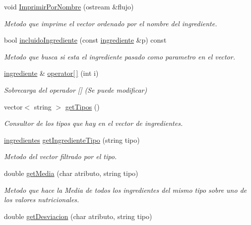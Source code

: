\begin{DoxyCompactItemize}
void \hyperlink{classingredientes_adefafd151edf8a8997bca2dc22057ece}{Imprimir\+Por\+Nombre} (ostream \&flujo)
\begin{DoxyCompactList}\small\item\em Metodo que imprime el vector ordenado por el nombre del ingrediente. \end{DoxyCompactList}\item 
bool \hyperlink{classingredientes_a6d3f30e2e79299a970c705f61a8ee4d7}{incluido\+Ingrediente} (const \hyperlink{classingrediente}{ingrediente} \&p) const
\begin{DoxyCompactList}\small\item\em Metodo que busca si esta el ingrediente pasado como parametro en el vector. \end{DoxyCompactList}\item 
\hyperlink{classingrediente}{ingrediente} \& \hyperlink{classingredientes_a9e099786f83d0ac3cf38317b194691db}{operator\mbox{[}$\,$\mbox{]}} (int i)
\begin{DoxyCompactList}\small\item\em Sobrecarga del operador \mbox{[}\mbox{]} (Se puede modificar) \end{DoxyCompactList}\item 
vector$<$ string $>$ \hyperlink{classingredientes_a57594cb6c675d23f7894fe6388c95a7f}{get\+Tipos} ()
\begin{DoxyCompactList}\small\item\em Consultor de los tipos que hay en el vector de ingredientes. \end{DoxyCompactList}\item 
\hyperlink{classingredientes}{ingredientes} \hyperlink{classingredientes_a160ecb07facb16cbe7369ea797c67549}{get\+Ingrediente\+Tipo} (string tipo)
\begin{DoxyCompactList}\small\item\em Metodo del vector filtrado por el tipo. \end{DoxyCompactList}\item 
double \hyperlink{classingredientes_aa124bb75b0ff0b233d313fce58668868}{get\+Media} (char atributo, string tipo)
\begin{DoxyCompactList}\small\item\em Metodo que hace la Media de todos los ingredientes del mismo tipo sobre uno de los valores nutricionales. \end{DoxyCompactList}\item 
double \hyperlink{classingredientes_adc3f70ae78a02993e6a4b8dac6a4ba07}{get\+Desviacion} (char atributo, string tipo)

\end{DoxyCompactItemize}

